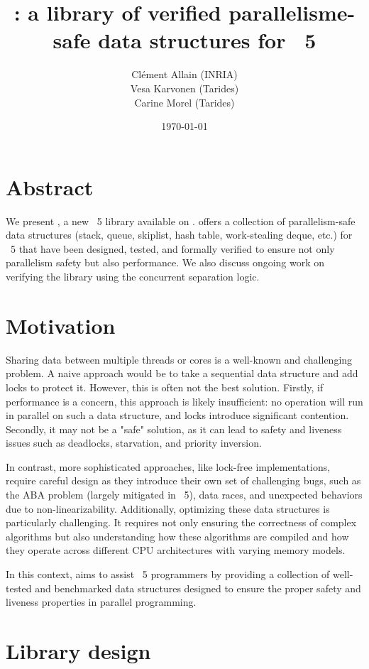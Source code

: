 \documentclass[a4paper, 11pt]{article}
\title{\Saturn: a library of verified parallelisme-safe data structures for \OCaml~5}
\date{\today}
\author{
  Clément Allain (INRIA) \\
  Vesa Karvonen (Tarides) \\
  Carine Morel (Tarides)
}
\begin{document}
\maketitle

\section{Abstract}
We present \Saturn, a new \OCaml~5 library available on \opam. \Saturn offers a collection of parallelism-safe data structures (stack, queue, skiplist, hash table, work-stealing deque, etc.) for \OCaml~5 that have been designed, tested, and formally verified to ensure not only parallelism safety but also performance. We also discuss ongoing work on verifying the library using the \Iris concurrent separation logic.

\section{Motivation}

Sharing data between multiple threads or cores is a well-known and challenging problem. A naive approach would be to take a sequential data structure and add locks to protect it. However, this is often not the best solution. Firstly, if performance is a concern, this approach is likely insufficient: no operation will run in parallel on such a data structure, and locks introduce significant contention. Secondly, it may not be a "safe" solution, as it can lead to safety and liveness issues such as deadlocks, starvation, and priority inversion.

In contrast, more sophisticated approaches, like lock-free implementations, require careful design as they introduce their own set of challenging bugs, such as the ABA problem (largely mitigated in \OCaml~5), data races, and unexpected behaviors due to non-linearizability. Additionally, optimizing these data structures is particularly challenging. It requires not only ensuring the correctness of complex algorithms but also understanding how these algorithms are compiled and how they operate across different CPU architectures with varying memory models.

In this context, \Saturn aims to assist \OCaml~5 programmers by providing a collection of well-tested and benchmarked data structures designed to ensure the proper safety and liveness properties in parallel programming.

\section{Library design}
\end{document}
